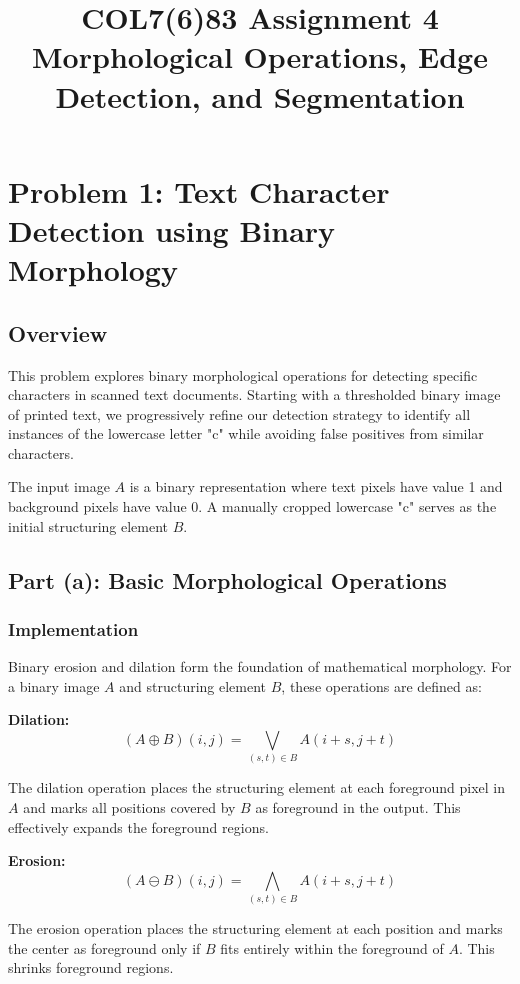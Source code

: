 \documentclass[11pt,a4paper]{article}
\title{COL7(6)83 Assignment 4 \\ Morphological Operations, Edge Detection, and Segmentation}
\begin{document}
\maketitle

\section{Problem 1: Text Character Detection using Binary Morphology}

\subsection{Overview}
This problem explores binary morphological operations for detecting specific characters in scanned text documents. Starting with a thresholded binary image of printed text, we progressively refine our detection strategy to identify all instances of the lowercase letter "c" while avoiding false positives from similar characters.

The input image $A$ is a binary representation where text pixels have value 1 and background pixels have value 0. A manually cropped lowercase "c" serves as the initial structuring element $B$.

\subsection{Part (a): Basic Morphological Operations}

\subsubsection{Implementation}
Binary erosion and dilation form the foundation of mathematical morphology. For a binary image $A$ and structuring element $B$, these operations are defined as:

\textbf{Dilation:}
$$(A \oplus B)(i,j) = \bigvee_{(s,t) \in B} A(i+s, j+t)$$

The dilation operation places the structuring element at each foreground pixel in $A$ and marks all positions covered by $B$ as foreground in the output. This effectively expands the foreground regions.

\textbf{Erosion:}
$$(A \ominus B)(i,j) = \bigwedge_{(s,t) \in B} A(i+s, j+t)$$

The erosion operation places the structuring element at each position and marks the center as foreground only if $B$ fits entirely within the foreground of $A$. This shrinks foreground regions.
\end{document}
